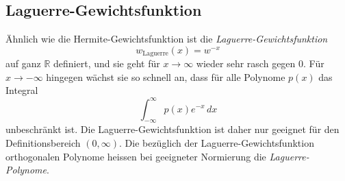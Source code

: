 %
%
\subsection{Laguerre-Gewichtsfunktion}
Ähnlich wie die Hermite-Gewichtsfunktion ist die
{\em Laguerre-Gewichtsfunktion}
%
\[
w_{\text{Laguerre}}(x)
=
w^{-x}
\]
auf ganz $\mathbb{R}$ definiert, und sie geht für $x\to\infty$ wieder
sehr rasch gegen $0$.
Für $x\to-\infty$ hingegen wächst sie so schnell an, dass für alle Polynome
$p(x)$ das Integral
\[
\int_{-\infty}^\infty p(x)e^{-x}\,dx
\]
unbeschränkt ist.
Die Laguerre-Gewichtsfunktion ist daher nur geeignet für den
Definitionsbereich $(0,\infty)$.
Die bezüglich der Laguerre-Gewichtsfunktion orthogonalen Polynome
heissen bei geeigneter Normierung die {\em Laguerre-Polynome}.
%
